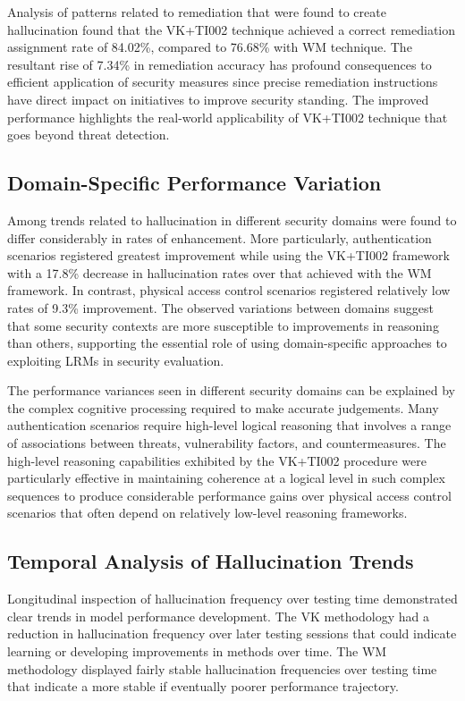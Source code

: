 \documentclass[sigconf]{acmart}
\begin{document}
Analysis of patterns related to remediation that were found to create hallucination found that the VK+TI002 technique achieved a correct remediation assignment rate of 84.02\%, compared to 76.68\% with WM technique. The resultant rise of 7.34\% in remediation accuracy has profound consequences to efficient application of security measures since precise remediation instructions have direct impact on initiatives to improve security standing. The improved performance highlights the real-world applicability of VK+TI002 technique that goes beyond threat detection.

\subsection{Domain-Specific Performance Variation}
Among trends related to hallucination in different security domains were found to differ considerably in rates of enhancement. More particularly, authentication scenarios registered greatest improvement while using the VK+TI002 framework with a 17.8\% decrease in hallucination rates over that achieved with the WM framework. In contrast, physical access control scenarios registered relatively low rates of 9.3\% improvement. The observed variations between domains suggest that some security contexts are more susceptible to improvements in reasoning than others, supporting the essential role of using domain-specific approaches to exploiting LRMs in security evaluation.

The performance variances seen in different security domains can be explained by the complex cognitive processing required to make accurate judgements. Many authentication scenarios require high-level logical reasoning that involves a range of associations between threats, vulnerability factors, and countermeasures. The high-level reasoning capabilities exhibited by the VK+TI002 procedure were particularly effective in maintaining coherence at a logical level in such complex sequences to produce considerable performance gains over physical access control scenarios that often depend on relatively low-level reasoning frameworks.

\subsection{Temporal Analysis of Hallucination Trends}
Longitudinal inspection of hallucination frequency over testing time demonstrated clear trends in model performance development. The VK methodology had a reduction in hallucination frequency over later testing sessions that could indicate learning or developing improvements in methods over time. The WM methodology displayed fairly stable hallucination frequencies over testing time that indicate a more stable if eventually poorer performance trajectory.
\end{document}

